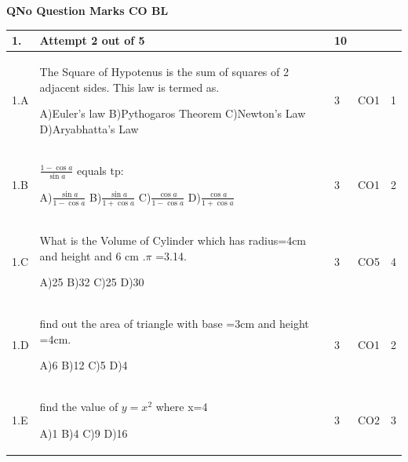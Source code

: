 \documentclass[12pt]{article}
\begin{document}
	\begin{flushleft}
	\bf{QNo}\hspace{1.2cm} \bf{Question} \hspace{5.5cm}  \bf{Marks} \hspace{0.2cm} \bf{CO} \hspace{0.2cm}	\bf{BL}	
	
\end{flushleft} 
	\begin{longtable}{|L{1cm}|L{8cm}|C{1cm}|C{1cm}|C{1cm}|}\hline
		\bf{1}. & \bf{Attempt} \bf2 \bf{out} of \bf5 & \bf10  & & \\ \hline
				1.A & The Square of Hypotenus is the sum of squares of 2 adjacent sides. This law is termed as. \newline
					
		A)Euler's law\newline
		B)Pythogaros  Theorem\newline
		C)Newton's Law\newline
		D)Aryabhatta's Law &
		3 &
		CO1&
		1 \\ \hline
		
				1.B & $\frac{1-\cos a}{\sin a}$  equals tp: \newline
					
		A)$\frac{\sin a}{1-\cos a}$\newline
		B)$\frac{\sin a}{1+\cos a}$\newline
		C)$\frac{\cos a}{1-\cos a}$\newline
		D)$\frac{\cos a}{1+\cos a}$ &
		3 &
		CO1&
		2 \\ \hline
		
				1.C & What is the Volume of Cylinder which has radius=4cm and height and 6 cm .$\pi$ =3.14. \newline
					
		A)25\newline
		B)32\newline
		C)25\newline
		D)30 &
		3 &
		CO5&
		4 \\ \hline
		
				1.D & find out the area of triangle with base =3cm and height =4cm. \newline
					
		A)6\newline
		B)12\newline
		C)5\newline
		D)4 &
		3 &
		CO1&
		2 \\ \hline
		
				1.E & find the value of   $y=x^{2}$  where x=4 \newline
					
		A)1\newline
		B)4\newline
		C)9\newline
		D)16 &
		3 &
		CO2&
		3 \\ \hline
		
		
	\end{longtable}
\end{document}
